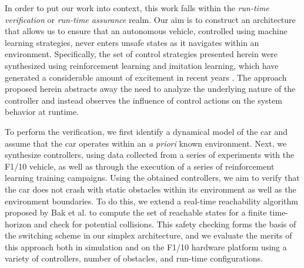 \documentclass[manuscript,screen,review]{acmart}
\newcommand{\todo}[1]{\textcolor{red}{\textbf{\underline{TODO:}} #1}}
\begin{document}
In order to put our work into context, this work falls within the \textit{run-time verification} or \textit{run-time assurance} realm. Our aim is to construct an architecture that allows us to ensure that an autonomous vehicle, controlled using machine learning strategies, never enters unsafe states as it navigates within an environment. Specifically, the set of control strategies presented herein were synthesized using reinforcement learning and imitation learning, which have generated a considerable amount of excitement in recent years \cite{bojarski2016end,lillicrap2015continuous}. The approach proposed herein abstracts away the need to analyze the underlying nature of the controller and instead observes the influence of control actions on the system behavior at runtime. %

To perform the verification, we first identify a dynamical model of the car and assume that the car operates within an \textit{a priori} known environment. Next, we synthesize controllers, using data collected from a series of experiments with the F1/10 vehicle, as well as through the execution of a series of reinforcement learning training campaigns. Using the obtained controllers, we aim to verify that the car does not crash with static obstacles within its environment as well as the environment boundaries. To do this, we extend a real-time reachability algorithm proposed by Bak et al. \cite{Bak2014,Johnson2016} to compute the set of reachable states for a finite time-horizon and check for potential collisions. This safety checking forms the basis of the switching scheme in our simplex architecture, and we evaluate the merits of this approach both in simulation and on the F1/10 hardware platform using a variety of controllers, number of obstacles, and run-time configurations.
\end{document}
